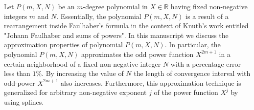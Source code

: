 Let $P(m, X, N)$ be an $m$-degree polynomial in $X\in\mathbb{R}$
having fixed non-negative integers $m$ and $N$.
Essentially, the polynomial $P(m, X, N)$ is a result of a rearrangement inside Faulhaber's formula
in the context of Knuth's work entitled "Johann Faulhaber and sums of powers".
In this manuscript we discuss the approximation properties of polynomial $P(m,X,N)$.
In particular, the polynomial $P(m,X,N)$ approximates the odd power function $X^{2m+1}$ in a certain neighborhood
of a fixed non-negative integer $N$ with a percentage error less than $1\%$.
By increasing the value of $N$ the length of convergence interval with odd-power $X^{2m+1}$ also increases.
Furthermore, this approximation technique is generalized for arbitrary non-negative exponent $j$ of the power function $X^j$
by using splines.
